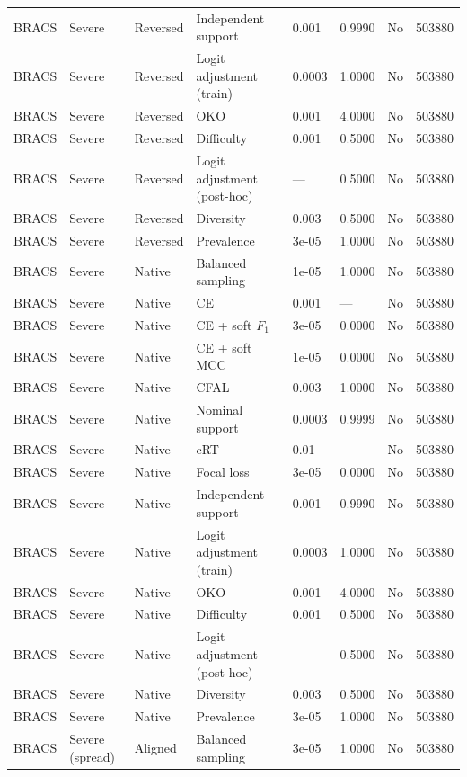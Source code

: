 \begin{longtable}{lllllllr}
BRACS & Severe & Reversed & Independent support & 0.001 & 0.9990 & No & 503880 \\
BRACS & Severe & Reversed & Logit adjustment (train) & 0.0003 & 1.0000 & No & 503880 \\
BRACS & Severe & Reversed & OKO & 0.001 & 4.0000 & No & 503880 \\
BRACS & Severe & Reversed & Difficulty & 0.001 & 0.5000 & No & 503880 \\
BRACS & Severe & Reversed & Logit adjustment (post-hoc) & --- & 0.5000 & No & 503880 \\
BRACS & Severe & Reversed & Diversity & 0.003 & 0.5000 & No & 503880 \\
BRACS & Severe & Reversed & Prevalence & 3e-05 & 1.0000 & No & 503880 \\
BRACS & Severe & Native & Balanced sampling & 1e-05 & 1.0000 & No & 503880 \\
BRACS & Severe & Native & CE & 0.001 & --- & No & 503880 \\
BRACS & Severe & Native & CE + soft $F_1$ & 3e-05 & 0.0000 & No & 503880 \\
BRACS & Severe & Native & CE + soft MCC & 1e-05 & 0.0000 & No & 503880 \\
BRACS & Severe & Native & CFAL & 0.003 & 1.0000 & No & 503880 \\
BRACS & Severe & Native & Nominal support & 0.0003 & 0.9999 & No & 503880 \\
BRACS & Severe & Native & cRT & 0.01 & --- & No & 503880 \\
BRACS & Severe & Native & Focal loss & 3e-05 & 0.0000 & No & 503880 \\
BRACS & Severe & Native & Independent support & 0.001 & 0.9990 & No & 503880 \\
BRACS & Severe & Native & Logit adjustment (train) & 0.0003 & 1.0000 & No & 503880 \\
BRACS & Severe & Native & OKO & 0.001 & 4.0000 & No & 503880 \\
BRACS & Severe & Native & Difficulty & 0.001 & 0.5000 & No & 503880 \\
BRACS & Severe & Native & Logit adjustment (post-hoc) & --- & 0.5000 & No & 503880 \\
BRACS & Severe & Native & Diversity & 0.003 & 0.5000 & No & 503880 \\
BRACS & Severe & Native & Prevalence & 3e-05 & 1.0000 & No & 503880 \\
BRACS & Severe (spread) & Aligned & Balanced sampling & 3e-05 & 1.0000 & No & 503880 \\

\end{longtable}
